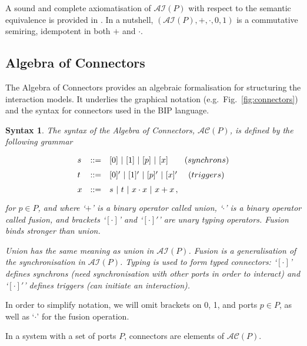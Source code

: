 \documentclass{llncs}
\newcommand{\fig}[1]{Fig.~\ref{fig:#1}}
\newcommand{\eg}[1][\ ]{e.g.#1}
\newtheorem*{syntax}{Syntax}
\newcommand{\ai}{\ensuremath{\mathcal{AI}}}
\newcommand{\ac}{\ensuremath{\mathcal{AC}}}
\begin{document}
A sound and complete axiomatisation of $\ai(P)$ with respect to the
semantic equivalence is provided in \cite{BliSif07-acp-emsoft}.  In a
nutshell, $(\ai(P), +, \cdot, 0, 1)$ is a commutative semiring,
idempotent in both $+$ and $\cdot$.



\subsection{Algebra of Connectors}
\label{secn:ac}

The Algebra of Connectors provides an algebraic formalisation for
structuring the interaction models.  It underlies the graphical
notation (\eg \fig{connectors}) and the syntax for connectors used in the BIP language.

\begin{syntax}
The syntax of the {\em Algebra of Connectors}, $\ac(P)$, is defined by the
following grammar
%
\begin{equation} \label{eq:acsynt}
  \renewcommand{\arraystretch}{1.5}
  \begin{array}{lcll}
    s & ::= & [0]\ |\ [1]\ |\ [p]\ |\ [x] \:\:\:\:\:\:\:\:\:(synchrons)\\
    t & ::= & [0]'\ |\ [1]'\ |\ [p]'\ |\ [x]'  \:\:\:\:\:\:   (triggers)\\
    x & ::= & s\ |\ t\ |\ x\cdot x\ |\ x + x\,, 
  \end{array}
\end{equation}
for $p\in P$, and where `$+$' is a binary operator called {\em union},
`$\cdot$' is a binary operator called {\em fusion}, and brackets
`$[\cdot]$' and `$[\cdot]'$' are unary {\em typing} operators.  Fusion
binds stronger than union.

Union has the same meaning as union in $\ai(P)$. Fusion is a
generalisation of the synchronisation in $\ai(P)$.  Typing is used to
form typed connectors: `$[\cdot]$' defines {\em synchrons} (need
synchronisation with other ports in order to interact) and
`$[\cdot]'$' defines {\em triggers} (can initiate an interaction).
\end{syntax}

In order to simplify notation, we will omit brackets on 0, 1, and
ports $p \in P$, as well as `$\cdot$' for the fusion operation.

\begin{definition}
 In a system with a set of ports $P$, connectors are elements of $\ac(P)$.
\end{definition} 
\end{document}
